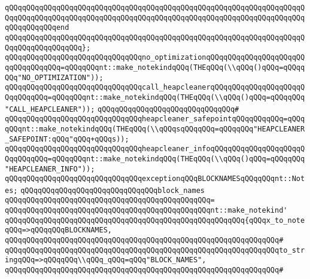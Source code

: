 \verb|qQQqqQQqqQQqqQQqqQQqqQQqqQQqqQQqqQQqqQQqqQQqqQQqqQQqqQQqqQQqqQQqqQQqqQQqqQQqqQQqqQQqqQQqqQQqqQQqqQQqqQQqqQQqqQQqqQQqqQQqqQQqqQQqqQQqqQQqqQQqqQQqqQQqqQQqend|\newline
\verb|qQQqqQQqqQQqqQQqqQQqqQQqqQQqqQQqqQQqqQQqqQQqqQQqqQQqqQQqqQQqqQQqqQQqqQQqqQQqqQQqqQQqqQQq};|\newline
\newline
\verb|qQQqqQQqqQQqqQQqqQQqqQQqqQQqqQQqno_optimizationqQQqqQQqqQQqqQQqqQQqqQQqqQQqqQQqqQQq=qQQqqQQqnt::make_notekindqQQq(THEqQQq(\\qQQq()qQQq=qQQqqQQq"NO_OPTIMIZATION"));|\newline
\verb|qQQqqQQqqQQqqQQqqQQqqQQqqQQqqQQqcall_heapcleanerqQQqqQQqqQQqqQQqqQQqqQQqqQQqqQQq=qQQqqQQqnt::make_notekindqQQq(THEqQQq(\\qQQq()qQQq=qQQqqQQq"CALL_HEAPCLEANER"));|\newline
\verb|qQQqqQQqqQQqqQQqqQQqqQQqqQQqqQQq#|\newline
\verb|qQQqqQQqqQQqqQQqqQQqqQQqqQQqqQQqheapcleaner_safepointqQQqqQQqqQQq=qQQqqQQqnt::make_notekindqQQq(THEqQQq(\\qQQqsqQQqqQQq=qQQqqQQq"HEAPCLEANER_SAFEPOINT:qQQq"qQQq+qQQqs));|\newline
\verb|qQQqqQQqqQQqqQQqqQQqqQQqqQQqqQQqheapcleaner_infoqQQqqQQqqQQqqQQqqQQqqQQqqQQqqQQq=qQQqqQQqnt::make_notekindqQQq(THEqQQq(\\qQQq()qQQq=qQQqqQQq"HEAPCLEANER_INFO"));|\newline
\newline
\verb|qQQqqQQqqQQqqQQqqQQqqQQqqQQqqQQqexceptionqQQqBLOCKNAMESqQQqqQQqnt::Notes;|\newline
\newline
\verb|qQQqqQQqqQQqqQQqqQQqqQQqqQQqqQQqblock_names|\newline
\verb|qQQqqQQqqQQqqQQqqQQqqQQqqQQqqQQqqQQqqQQqqQQqqQQq=|\newline
\verb|qQQqqQQqqQQqqQQqqQQqqQQqqQQqqQQqqQQqqQQqqQQqqQQqnt::make_notekind'|\newline
\verb|qQQqqQQqqQQqqQQqqQQqqQQqqQQqqQQqqQQqqQQqqQQqqQQqqQQqqQQq{qQQqx_to_noteqQQq=>qQQqqQQqBLOCKNAMES,|\newline
\verb|qQQqqQQqqQQqqQQqqQQqqQQqqQQqqQQqqQQqqQQqqQQqqQQqqQQqqQQqqQQqqQQq#|\newline
\verb|qQQqqQQqqQQqqQQqqQQqqQQqqQQqqQQqqQQqqQQqqQQqqQQqqQQqqQQqqQQqqQQqto_stringqQQq=>qQQqqQQq\\qQQq_qQQq=qQQq"BLOCK_NAMES",|\newline
\verb|qQQqqQQqqQQqqQQqqQQqqQQqqQQqqQQqqQQqqQQqqQQqqQQqqQQqqQQqqQQqqQQq#|\newline
